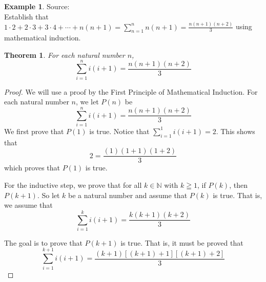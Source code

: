 \documentclass{book}
\newtheorem{theorem}{Theorem}[section]
\theoremstyle{definition}
\newtheorem{example}{Example}[definition]
\theoremstyle{remark}
\newcommand{\bb}[1]{\mathbb{#1}}
\newcommand{\m}{\cdot}
\begin{document}
\newpage
\begin{example}
Source: \cite[Chap.1, S.1.1, Prob.1.1, Q.1.C]{david} \\ 

Establish that ${1 \m 2} + {2 \m 3} + {3 \m 4}  + \cdots + n(n + 1) = \sum_{n=1}^{n}{n(n+1)} = \frac{n(n+1)(n+2)}{3}$ using mathematical induction.
    \begin{tcolorbox}
        \begin{theorem}
            For each natural number $n$,
                \begin{equation*}
                     \sum_{i=1}^{n}{i(i+1)} = \frac{n(n+1)(n+2)}{3}
                \end{equation*}
        \end{theorem}
    \end{tcolorbox}

    \begin{proof}
        We will use a proof by the First Principle of Mathematical Induction. For each natural number $n$, we let $P(n)$ be
            \begin{equation*}
                \sum_{i=1}^{n}{i(i+1)} = \frac{n(n+1)(n+2)}{3}
            \end{equation*}
        We first prove that $P(1)$ is true. Notice that $\sum_{i=1}^{1}{i(i+1)} = 2$. This shows that   
            \begin{equation*}
                 2 = \frac{(1)(1+1)(1+2)}{3}
            \end{equation*}
        which proves that $P(1)$ is true. 
        
        For the inductive step, we prove that for all $k \in \bb{N}$ with $k \geqq 1$, if $P(k)$, then $P(k+1)$. So let $k$ be a natural number and assume that $P(k)$ is true. That is, we assume that 
            \begin{equation*}
                \sum_{i=1}^{k}{i(i+1)} = \frac{k(k+1)(k+2)}{3}
            \end{equation*}
        
        The goal is to prove that $P(k+1)$ is true. That is, it must be proved that  
            \begin{equation}
            \label{dne3}
                \sum_{i=1}^{k+1}{i(i+1)} = \frac{(k+1)[(k+1)+1][(k+1)+2]}{3}                
            \end{equation}
        

\end{proof}
\end{example}
\end{document}
